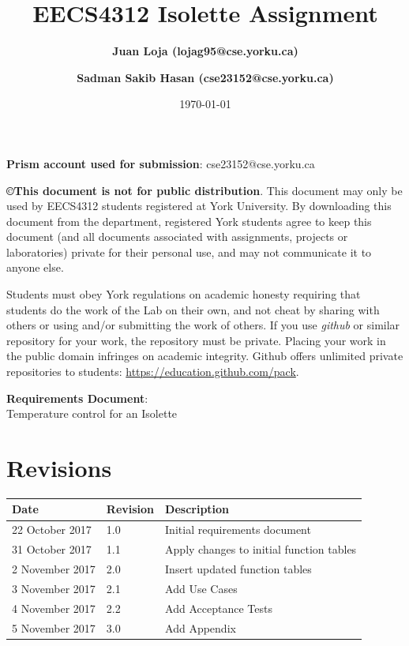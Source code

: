\documentclass[fontsize=12pt,paper=letter,twoside]{scrartcl}
\author{\textbf{Juan Loja (lojag95@cse.yorku.ca)}
\and \textbf{Sadman Sakib Hasan (cse23152@cse.yorku.ca)}
}
\date{\today} %
\begin{document}
\title{EECS4312 Isolette Assignment}
\maketitle

\noindent \textbf{Prism account used for submission}: cse23152@cse.yorku.ca

\begin {mdframed}
\textbf{\copyright This document is not for public distribution}. This document may only be used by EECS4312 students registered at York University. By downloading this document from the department, registered York students agree to keep this document (and all documents associated with assignments, projects or laboratories) private for their personal use, and may not communicate it to anyone else. 

Students must obey York regulations on academic honesty requiring that students do the work of the Lab on their own, and not cheat by sharing with others or using and/or submitting the work of others. If you use \textit{github} or similar repository for your work,  the repository must be private. Placing your work in the public domain infringes on academic integrity. Github offers unlimited private repositories to students: \url{https://education.github.com/pack}.

\end {mdframed}

\newpage

\vspace*{2in}
\begin{center}
\huge{\textbf{Requirements Document}:\\ Temperature control for an Isolette}
\end{center}

\bigskip\bigskip

\section*{Revisions}

\begin{tabular}{|l|l|p{3in}|}
\hline
Date & Revision& Description \\ 
\hline
22 October  2017
& 1.0       
& Initial requirements document\\ 
\hline
31 October  2017
& 1.1       
& Apply changes to initial function tables\\
\hline
2 November  2017
& 2.0       
& Insert updated function tables\\
\hline
3 November  2017
& 2.1       
& Add Use Cases\\
\hline
4 November  2017
& 2.2       
& Add Acceptance Tests\\
\hline
5 November  2017
& 3.0     
& Add Appendix\\
\hline
\end{tabular}
\end{document}
